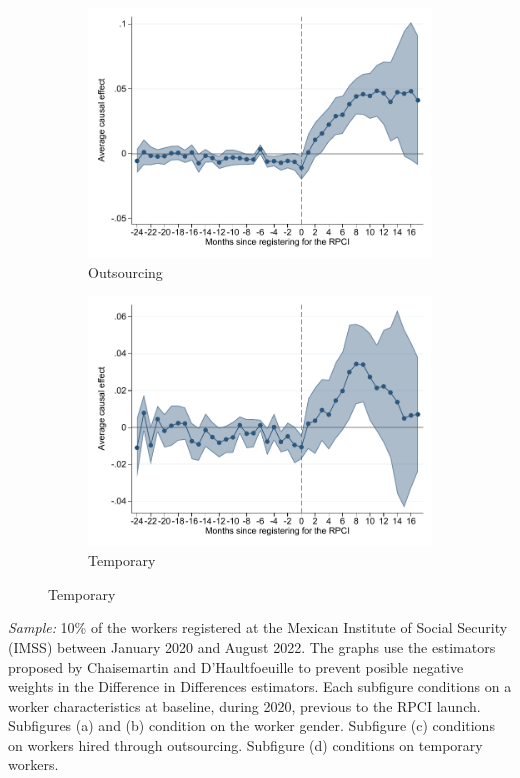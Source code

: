 \documentclass[oneside,11pt]{article}
\begin{document}
\begin{figure}[H]
\begin{center}
    \begin{subfigure}{0.49\textwidth}
    \caption{Outsourcing}
    \includegraphics[width=\textwidth]{04_Figures/muestra_10porciento/event_study_log_sal_cierre_chaisemartin_outsourcing.pdf}
    \end{subfigure}
    \begin{subfigure}{0.49\textwidth}
    \caption{Temporary}
    \includegraphics[width=\textwidth]{04_Figures/muestra_10porciento/event_study_log_sal_cierre_chaisemartin_eventual.pdf}
    \end{subfigure}
    
    \end{center}
\end{figure}
\scriptsize{
\noindent \textit{Sample:} 10\% of the workers registered at the Mexican Institute of Social Security (IMSS) between January 2020 and August 2022. The graphs use the estimators proposed by Chaisemartin and D'Haultfoeuille to prevent posible negative weights in the Difference in Differences estimators. Each subfigure conditions on a worker characteristics at baseline, during 2020, previous to the RPCI launch. Subfigures (a) and (b) condition on the worker gender. Subfigure (c) conditions on workers hired through outsourcing. Subfigure (d) conditions on temporary workers.
}
\end{document}
